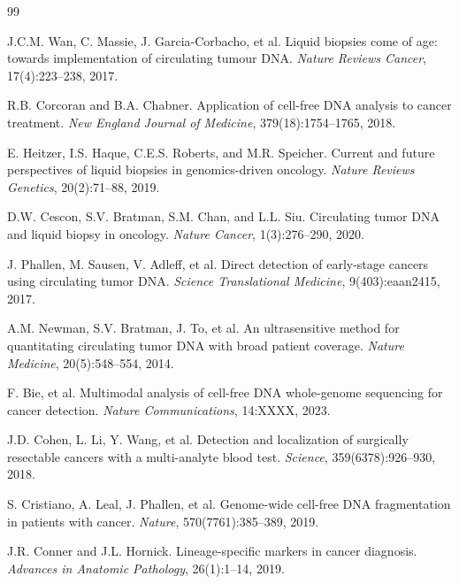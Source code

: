 \documentclass[11pt,a4paper]{article}
\begin{document}
\begin{thebibliography}{99}

J.C.M. Wan, C. Massie, J. Garcia-Corbacho, et al.
Liquid biopsies come of age: towards implementation of circulating tumour DNA.
\textit{Nature Reviews Cancer}, 17(4):223--238, 2017.

R.B. Corcoran and B.A. Chabner.
Application of cell-free DNA analysis to cancer treatment.
\textit{New England Journal of Medicine}, 379(18):1754--1765, 2018.

E. Heitzer, I.S. Haque, C.E.S. Roberts, and M.R. Speicher.
Current and future perspectives of liquid biopsies in genomics-driven oncology.
\textit{Nature Reviews Genetics}, 20(2):71--88, 2019.

D.W. Cescon, S.V. Bratman, S.M. Chan, and L.L. Siu.
Circulating tumor DNA and liquid biopsy in oncology.
\textit{Nature Cancer}, 1(3):276--290, 2020.

J. Phallen, M. Sausen, V. Adleff, et al.
Direct detection of early-stage cancers using circulating tumor DNA.
\textit{Science Translational Medicine}, 9(403):eaan2415, 2017.

A.M. Newman, S.V. Bratman, J. To, et al.
An ultrasensitive method for quantitating circulating tumor DNA with broad patient coverage.
\textit{Nature Medicine}, 20(5):548--554, 2014.

F. Bie, et al.
Multimodal analysis of cell-free DNA whole-genome sequencing for cancer detection.
\textit{Nature Communications}, 14:XXXX, 2023.

J.D. Cohen, L. Li, Y. Wang, et al.
Detection and localization of surgically resectable cancers with a multi-analyte blood test.
\textit{Science}, 359(6378):926--930, 2018.

S. Cristiano, A. Leal, J. Phallen, et al.
Genome-wide cell-free DNA fragmentation in patients with cancer.
\textit{Nature}, 570(7761):385--389, 2019.

J.R. Conner and J.L. Hornick.
Lineage-specific markers in cancer diagnosis.
\textit{Advances in Anatomic Pathology}, 26(1):1--14, 2019.

\end{thebibliography}
\end{document}
